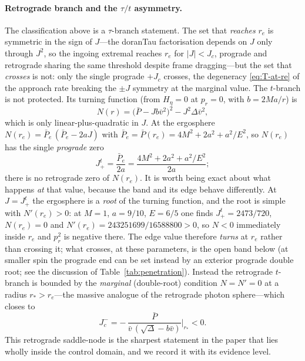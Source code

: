 \documentclass[12pt]{iopart}
\theoremstyle{plain}
\theoremstyle{definition}
\theoremstyle{remark}
\newcommand{\re}{r_{e}}
\newcommand{\Jc}{J_{c}}
\begin{document}
\paragraph{Retrograde branch and the $\tau/t$ asymmetry.} The classification above
is a $\tau$-branch statement. The set that \emph{reaches} $\re$ is symmetric in
the sign of $J$---the doranTau factorisation depends on $J$ only through $J^2$, so
the ingoing extremal reaches $\re$ for $|J|<\Jc$, prograde and retrograde sharing
the same threshold despite frame dragging---but the set that \emph{crosses} is
not: only the single prograde $+\Jc$ crosses, the degeneracy
\eqref{eq:T-at-re} of the approach rate breaking the $\pm J$ symmetry at the
marginal value. The $t$-branch is not protected. Its turning function (from
$H_\eta=0$ at $p_r=0$, with $b=2Ma/r$) is
\begin{equation}
    N(r)=\big(\bar P-Jb\bar v^2\big)^2-J^2\Delta\bar v^2,
    \label{eq:tbranch-turn}
\end{equation}
which is only linear-plus-quadratic in $J$. At the ergosphere
$N(\re)=\bar P_e\,(\bar P_e-2aJ)$ with
$\bar P_e=\bar P(\re)=4M^2+2a^2+a^2/E^2$, so $N(\re)$ has the single
\emph{prograde} zero
\begin{equation}
    J_+^{t}=\frac{\bar P_e}{2a}=\frac{4M^2+2a^2+a^2/E^2}{2a};
    \label{eq:Jplus-t}
\end{equation}
there is no retrograde zero of $N(\re)$. It is worth being exact about what
happens \emph{at} that value, because the band and its edge behave differently.
At $J=J_+^t$ the ergosphere is a \emph{root} of the turning function, and the
root is simple with $N'(\re)>0$: at $M=1$, $a=9/10$, $E=6/5$ one finds
$J_+^t=2473/720$, $N(\re)=0$ and $N'(\re)=243251699/16588800>0$, so $N<0$
immediately inside $\re$ and $p_r^2$ is negative there. The edge value therefore
\emph{turns} at $\re$ rather than crossing it; what crosses, at these parameters, is the
open band below (at smaller spin the prograde end can be set instead by an exterior
prograde double root; see the discussion of Table~\ref{tab:penetration}). Instead the retrograde $t$-branch is
bounded by the \emph{marginal} (double-root) condition $N=N'=0$ at a radius
$r_*>\re$---the massive analogue of the retrograde photon sphere---which closes
to
\begin{equation}
    J_c^{-}=-\,\frac{\bar P}{\bar v\,(\sqrt\Delta-b\bar v)}\bigg|_{r_*}<0 .
    \label{eq:Jc-minus}
\end{equation}
This retrograde saddle-node is the sharpest statement in the paper that lies wholly
inside the control domain, and we record it with its evidence level.
\end{document}
